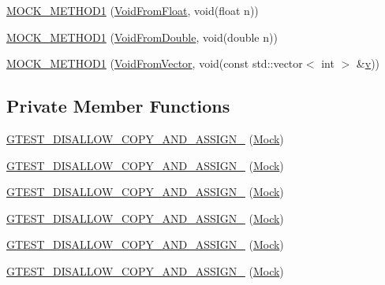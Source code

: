 \begin{DoxyCompactItemize}
\item 
\mbox{\hyperlink{class_mock_a3fd62026610c5d3d3aeaaf2ade3e18aa}{M\+O\+C\+K\+\_\+\+M\+E\+T\+H\+O\+D1}} (\mbox{\hyperlink{class_interface_ae2b3e9411c893a45642d3af632752c66}{Void\+From\+Float}}, void(float n))
\item 
\mbox{\hyperlink{class_mock_a890668928abcd28d4d39df164e7b6dd8}{M\+O\+C\+K\+\_\+\+M\+E\+T\+H\+O\+D1}} (\mbox{\hyperlink{class_interface_aa56524017aabdbe46510648c711ab8a8}{Void\+From\+Double}}, void(double n))
\item 
\mbox{\hyperlink{class_mock_a50e2bda4375a59bb89fd5652bd33eb0f}{M\+O\+C\+K\+\_\+\+M\+E\+T\+H\+O\+D1}} (\mbox{\hyperlink{class_interface_ae84fe7e53f881db2f823ad35d004927a}{Void\+From\+Vector}}, void(const std\+::vector$<$ int $>$ \&\mbox{\hyperlink{_important_values_8h_aaad811047eb9ea3edb6ec2bbeddb2b2b}{v}}))
\end{DoxyCompactItemize}
\subsection*{Private Member Functions}
\begin{DoxyCompactItemize}
\item 
\mbox{\hyperlink{class_mock_ab2c98b882136d91790d21e9299629662}{G\+T\+E\+S\+T\+\_\+\+D\+I\+S\+A\+L\+L\+O\+W\+\_\+\+C\+O\+P\+Y\+\_\+\+A\+N\+D\+\_\+\+A\+S\+S\+I\+G\+N\+\_\+}} (\mbox{\hyperlink{class_mock}{Mock}})
\item 
\mbox{\hyperlink{class_mock_ab2c98b882136d91790d21e9299629662}{G\+T\+E\+S\+T\+\_\+\+D\+I\+S\+A\+L\+L\+O\+W\+\_\+\+C\+O\+P\+Y\+\_\+\+A\+N\+D\+\_\+\+A\+S\+S\+I\+G\+N\+\_\+}} (\mbox{\hyperlink{class_mock}{Mock}})
\item 
\mbox{\hyperlink{class_mock_ab2c98b882136d91790d21e9299629662}{G\+T\+E\+S\+T\+\_\+\+D\+I\+S\+A\+L\+L\+O\+W\+\_\+\+C\+O\+P\+Y\+\_\+\+A\+N\+D\+\_\+\+A\+S\+S\+I\+G\+N\+\_\+}} (\mbox{\hyperlink{class_mock}{Mock}})
\item 
\mbox{\hyperlink{class_mock_ab2c98b882136d91790d21e9299629662}{G\+T\+E\+S\+T\+\_\+\+D\+I\+S\+A\+L\+L\+O\+W\+\_\+\+C\+O\+P\+Y\+\_\+\+A\+N\+D\+\_\+\+A\+S\+S\+I\+G\+N\+\_\+}} (\mbox{\hyperlink{class_mock}{Mock}})
\item 
\mbox{\hyperlink{class_mock_ab2c98b882136d91790d21e9299629662}{G\+T\+E\+S\+T\+\_\+\+D\+I\+S\+A\+L\+L\+O\+W\+\_\+\+C\+O\+P\+Y\+\_\+\+A\+N\+D\+\_\+\+A\+S\+S\+I\+G\+N\+\_\+}} (\mbox{\hyperlink{class_mock}{Mock}})
\item 
\mbox{\hyperlink{class_mock_ab2c98b882136d91790d21e9299629662}{G\+T\+E\+S\+T\+\_\+\+D\+I\+S\+A\+L\+L\+O\+W\+\_\+\+C\+O\+P\+Y\+\_\+\+A\+N\+D\+\_\+\+A\+S\+S\+I\+G\+N\+\_\+}} (\mbox{\hyperlink{class_mock}{Mock}})
\end{DoxyCompactItemize}



